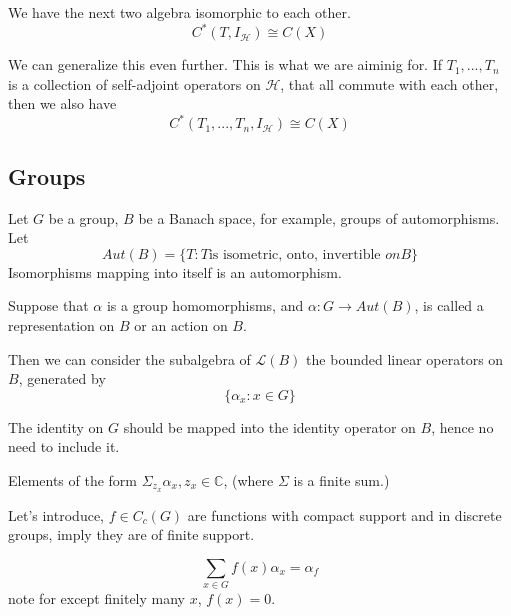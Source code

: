 \begin{proposition}
    We have the next two algebra isomorphic to each other.
    \begin{equation}
        C^*(T, I_\mathcal{H})\cong C(X)
    \end{equation}
\end{proposition}
We can generalize this even further.
This is what we are aiminig for. If $T_1,..., T_n$ is a collection of self-adjoint operators on $\mathcal{H}$, that all commute with each other,
then we also have
\begin{equation}
    C^*(T_1,..., T_n, I_\mathcal{H})\cong C(X)
\end{equation}

\subsection{Groups}

Let $G$ be a group, $B$ be a Banach space, for example, groups of automorphisms. Let
\begin{equation*} 
    Aut(B)=\{T:  T \text{is isometric, onto, invertible } on B\}
\end{equation*}    
Isomorphisms mapping into itself is an automorphism.

\begin{definition}
    Suppose that $\alpha$ is a group homomorphisms, and $\alpha: G\to Aut(B)$, is called a representation on $B$ or an action on $B$.
\end{definition}

Then we can consider the subalgebra of $\mathcal{L}(B)$ the bounded linear operators on $B$, generated by
\begin{equation*}
    \{\alpha_x:x\in G\}
\end{equation*}
\begin{remark}
    The identity on $G$ should be mapped into the identity operator on $B$, hence no need to include it.
\end{remark}

Elements of the form $\Sigma_{z_x}\alpha_x, z_x\in\mathbb{C}$, (where $\Sigma$ is a finite sum.)

Let's introduce,
$f\in C_c(G)$ are functions with compact support and in discrete groups, imply they are of finite support.

\begin{equation*}
    \sum_{x\in G}f(x)\alpha_x=\alpha_f
\end{equation*}
note for except finitely many $x$, $f(x)=0$.

